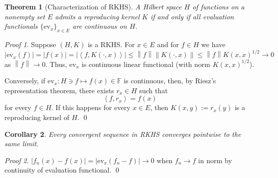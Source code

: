 \documentclass[a4paper,12pt]{article}
\newtheorem{thm}{Theorem}[section]
\newtheorem{cor}[thm]{Corollary}
\theoremstyle{remark}
\newtheorem*{prf}{Proof}
\theoremstyle{definition}
\theoremstyle{definition}
\theoremstyle{definition}
\newcommand{\ip}[2]{\left<#1, #2 \right>}
\newcommand{\abs}[1]{\left| #1 \right|}
\newcommand{\norm}[1]{\left\| #1 \right\|}
\newcommand{\ev}[1]{\mathrm{ev}_{#1}}
\begin{document}
\begin{thm}[Characterization of RKHS]\label{chara RKHS}
	A Hilbert space \( H \) of functions on a nonempty set \( E \) admits a reproducing kernel \( K \) if and only if all evaluation functionals \( \{\ev{x} \} _{x \in E} \) are continuous on \( H \).
\end{thm}
\begin{prf}
	Suppose \( (H,K) \) is a RKHS.
	For \( x \in E \) and for \( f \in H \) we have
	\[
		\abs{\ev{x}(f)} = \abs{f(x)} = \abs{ \ip{f}{K(\cdot , x)}} \le \norm{f} \norm{K(\cdot,x )} \le \norm{f} K(x,x) ^{1/2} \to 0
	\]
	as \(  \norm{f}\to 0 \). Thus, \( \ev{x} \) is continuous linear functional (with norm \( K(x,x) ^{1/2} \)).

	Conversely, if \( \ev{x}:H \ni f \mapsto f(x) \in \mathbb{F} \) is continuous, then, by Riesz's representation theorem, there exists \( r_x \in H\) such that
	\begin{equation*}
		\ip{f}{r_x} = f(x)
	\end{equation*}
	for every \( f \in H \). If this happens for every \( x \in E \), then \( K(x,y):=r_x(y) \) is a reproducing kernel of \( H \).
	\qed\end{prf}

\begin{cor}\label{norm convergence implies pointwiese convergence}
	Every convergent sequence in RKHS converges pointwise to the same limit.
\end{cor}
\begin{prf}
	\( \abs{ f_n(x) - f(x)} = \abs{\ev{x}(f_n - f)} \to 0 \) when \( f_n \to f \) in norm by continuity of evaluation functional.
	\qed\end{prf}
\end{document}
